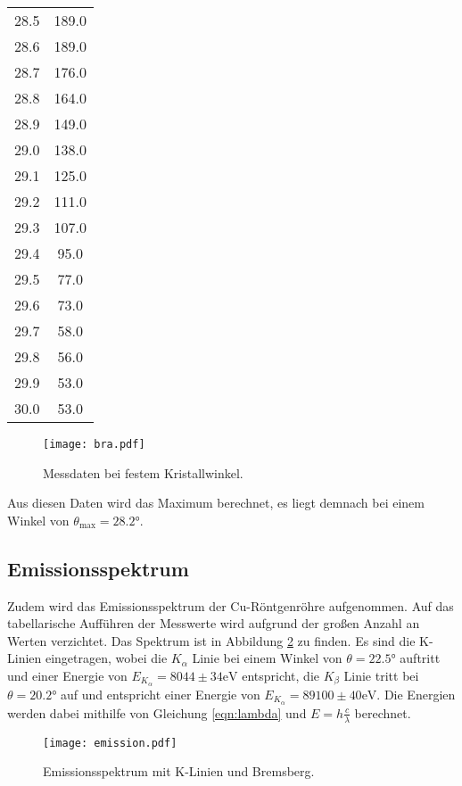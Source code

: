 \begin{table}
\begin{tabular}{c c}
      28.5	& 189.0 \\
      28.6	& 189.0 \\
      28.7	& 176.0 \\
      28.8	& 164.0 \\
      28.9	& 149.0 \\
      29.0	& 138.0 \\
      29.1	& 125.0 \\
      29.2	& 111.0 \\
      29.3	& 107.0 \\
      29.4	& 95.0\\
      29.5	& 77.0\\
      29.6	& 73.0\\
      29.7	& 58.0\\
      29.8	& 56.0\\
      29.9	& 53.0\\
      30.0	& 53.0\\
      \bottomrule
    \end{tabular}
  \end{table}

  \begin{figure}
    \centering
    \texttt{[image: bra.pdf]}
    \caption{Messdaten bei festem Kristallwinkel.}
    \label{fig:bra}
  \end{figure}

  \FloatBarrier
  \noindent Aus diesen Daten wird das Maximum berechnet, es liegt demnach bei einem Winkel von $\theta_{\text{max}} = 28.2°$. %

\subsection{Emissionsspektrum}
  Zudem wird das Emissionsspektrum der Cu-Röntgenröhre aufgenommen. Auf das tabellarische Aufführen der Messwerte wird aufgrund 
  der großen Anzahl an Werten verzichtet. Das Spektrum ist in Abbildung \ref{fig:emission} zu finden. Es sind die K-Linien eingetragen, wobei die 
  $K_{\alpha}$ Linie bei einem Winkel von $\theta = 22.5 °$ auftritt und einer Energie von $E_{K_{\alpha}} = 8044 \pm 34 \text{eV}$ entspricht,
  die $K_{\beta}$ Linie tritt bei $\theta = 20.2 °$ auf und entspricht einer Energie von $E_{K_{\alpha}} = 89100 \pm 40 \text{eV}$. Die Energien werden dabei mithilfe
  von Gleichung \eqref{eqn:lambda}
  und $E = h \frac{c}{\lambda}$ berechnet.

  \begin{figure}
    \centering
    \texttt{[image: emission.pdf]}
    \caption{Emissionsspektrum mit K-Linien und Bremsberg.}
    \label{fig:emission}
  \end{figure}

